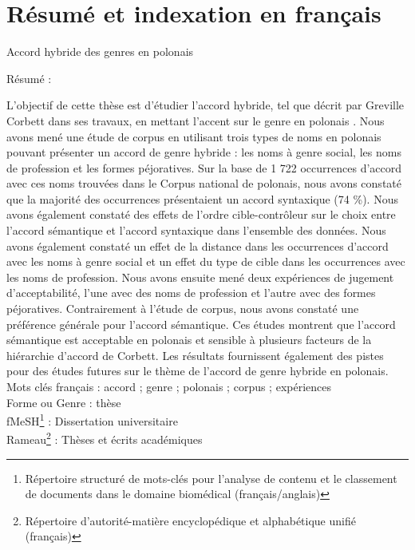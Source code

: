\chapter*{Résumé et indexation en français}\label{chap:Résumé}

Accord hybride des genres en polonais

Résumé : 

L'objectif de cette thèse est d'étudier l'accord hybride, tel que décrit par Greville Corbett dans ses travaux, en mettant l'accent sur le genre en polonais \citep{corbett_agreement_2023, corbett_agreement_1979}. Nous avons mené une étude de corpus en utilisant trois types de noms en polonais pouvant présenter un accord de genre hybride : les noms à genre social, les noms de profession et les formes péjoratives. Sur la base de 1 722 occurrences d'accord avec ces noms trouvées dans le Corpus national de polonais, nous avons constaté que la majorité des occurrences présentaient un accord syntaxique (74 \%). Nous avons également constaté des effets de l'ordre cible-contrôleur sur le choix entre l'accord sémantique et l'accord syntaxique dans l'ensemble des données. Nous avons également constaté un effet de la distance dans les occurrences d'accord avec les noms à genre social et un effet du type de cible dans les occurrences avec les noms de profession. Nous avons ensuite mené deux expériences de jugement d'acceptabilité, l'une avec des noms de profession et l'autre avec des formes péjoratives. Contrairement à l'étude de corpus, nous avons constaté une préférence générale pour l'accord sémantique. Ces études montrent que l'accord sémantique est acceptable en polonais et sensible à plusieurs facteurs de la hiérarchie d'accord de Corbett. Les résultats fournissent également des pistes pour des études futures sur le thème de l'accord de genre hybride en polonais.
\\

Mots clés français : accord ; genre ; polonais ; corpus ; expériences
\\

Forme ou Genre : thèse
\\

fMeSH\footnote{Répertoire structuré de mots-clés pour l'analyse de contenu et le classement de documents dans le domaine biomédical (français/anglais)} : Dissertation universitaire
\\

Rameau\footnote{Répertoire d'autorité-matière encyclopédique et alphabétique unifié (français)} :  Thèses et écrits académiques 	










